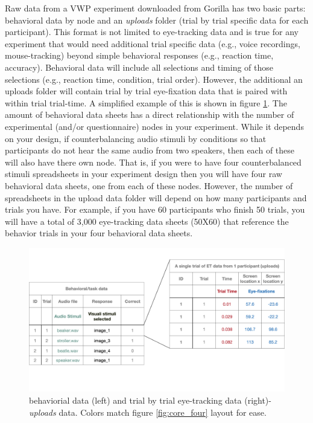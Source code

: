 Raw data from a VWP experiment downloaded from Gorilla has two basic parts: behavioral data by node and an \textit{uploads} folder (trial by trial specific data for each participant). This format is not limited to eye-tracking data and is true for any experiment that would need additional trial specific data (e.g., voice recordings, mouse-tracking) beyond simple behavioral responses (e.g., reaction time, accuracy). Behavioral data will include all selections and timing of those selections (e.g., reaction time, condition, trial order). However, the additional an uploads folder will contain trial by trial eye-fixation data that is paired with within trial trial-time.  A simplified example of this is shown in figure \ref{fig:data_structure}. The amount of behavioral data sheets has a direct relationship with the number of experimental (and/or questionnaire) nodes in your experiment. While it depends on your design, if counterbalancing audio stimuli by conditions so that participants do not hear the same audio from two speakers, then each of these will also have there own node. That is, if you were to have four counterbalanced stimuli spreadsheets in your experiment design then you will have four raw behavioral data sheets, one from each of these nodes. However, the number of spreadsheets in the upload data folder will depend on how many participants and trials you have. For example, if you have 60 participants who finish 50 trials, you will have a total of 3,000 eye-tracking data sheets (50X60) that reference the behavior trials in your four behavioral data sheets.

\begin{figure}[ht]
    \centering
    \includegraphics[scale=.2]{figures/data_structure.png}
    \caption{behaviorial data (left) and trial by trial eye-tracking data (right)-\textit{uploads} data. Colors match figure \ref{fig:core_four} layout for ease.}
    \label{fig:data_structure}
\end{figure}

